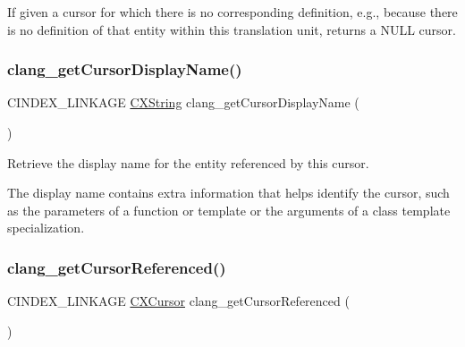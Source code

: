 If given a cursor for which there is no corresponding definition, e.\+g., because there is no definition of that entity within this translation unit, returns a N\+U\+LL cursor. \mbox{\label{group__CINDEX__CURSOR__XREF_gac3eba3224d109a956f9ef96fd4fe5c83}} 
\subsubsection{\texorpdfstring{clang\+\_\+get\+Cursor\+Display\+Name()}{clang\_getCursorDisplayName()}}
{\footnotesize\ttfamily C\+I\+N\+D\+E\+X\+\_\+\+L\+I\+N\+K\+A\+GE \hyperlink{structCXString}{C\+X\+String} clang\+\_\+get\+Cursor\+Display\+Name (\begin{DoxyParamCaption}\item[{\hyperlink{structCXCursor}{C\+X\+Cursor}}]{ }\end{DoxyParamCaption})}



Retrieve the display name for the entity referenced by this cursor. 

The display name contains extra information that helps identify the cursor, such as the parameters of a function or template or the arguments of a class template specialization. \mbox{\label{group__CINDEX__CURSOR__XREF_gabf059155921552e19fc2abed5b4ff73a}} 
\subsubsection{\texorpdfstring{clang\+\_\+get\+Cursor\+Referenced()}{clang\_getCursorReferenced()}}
{\footnotesize\ttfamily C\+I\+N\+D\+E\+X\+\_\+\+L\+I\+N\+K\+A\+GE \hyperlink{structCXCursor}{C\+X\+Cursor} clang\+\_\+get\+Cursor\+Referenced (\begin{DoxyParamCaption}\item[{\hyperlink{structCXCursor}{C\+X\+Cursor}}]{ }\end{DoxyParamCaption})}



